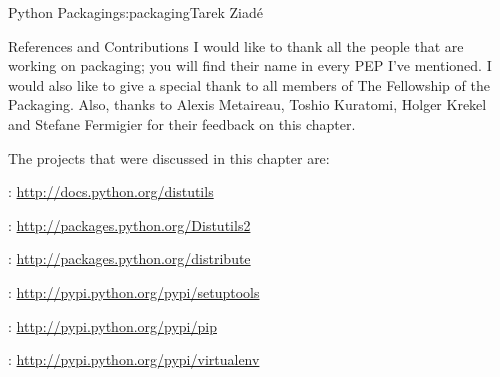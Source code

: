 \begin{aosachapter}{Python Packaging}{s:packaging}{Tarek Ziad\'{e}}
\begin{aosasect1}{References and Contributions}
I would like to thank all the people that are working on packaging;
you will find their name in every PEP I've mentioned. I would also
like to give a special thank to all members of The Fellowship of the
Packaging.  Also, thanks to Alexis Metaireau, Toshio Kuratomi, Holger
Krekel and Stefane Fermigier for their feedback on this chapter.

The projects that were discussed in this chapter are:

\begin{aosaitemize}
  \item {}: \url{http://docs.python.org/distutils}
  \item {}: \url{http://packages.python.org/Distutils2}
  \item {}: \url{http://packages.python.org/distribute}
  \item {}: \url{http://pypi.python.org/pypi/setuptools}
  \item {}: \url{http://pypi.python.org/pypi/pip}
  \item {}: \url{http://pypi.python.org/pypi/virtualenv}
\end{aosaitemize}

\end{aosasect1}

\end{aosachapter}
